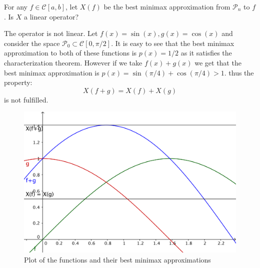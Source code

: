 \begin{problem}
For any $f \in \mathcal{C}[a,b]$, let $X(f)$ be the best minimax approximation from $\mathcal{P}_n$ to $f$. Is $X$ a linear operator?
\end{problem}

\begin{solution}
The operator is not linear. Let $f(x) = \sin (x), g(x) = \cos (x)$ and consider the space $\mathcal{P}_0 \subset \mathcal{C}[0, \pi/2]$. It is easy to see that the best minimax approximation to both of these functions is $p(x) = 1/2$ as it satisfies the characterization theorem. However if we take $f(x)+g(x)$ we get that the best minimax approximation is $p(x) = \sin(\pi/4)+\cos(\pi/4)>1$. thus the property:
\begin{equation*}
X(f+g) = X(f) + X(g)
\end{equation*}
is not fulfilled.
\begin{figure}[h]
\centering 
\includegraphics[scale = 0.5]{figtask6.png}
\caption{Plot of the functions and their best minimax approximations}
\label{figtask6}
\end{figure}

\end{solution}